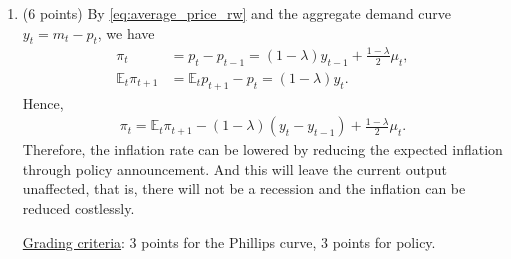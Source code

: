 \documentclass[12pt]{article}
\begin{document}
\begin{enumerate}
    Since $\lambda$ is increasing in $A$ and $A$ is decreasing in $\phi$, $\lambda$ is decreasing in $\phi$. In other words, if $\phi$ is lower, then the monetary shock has more persistent effect on output. Intuitively, as $\phi$ measures the degree of price rigidity, a lower $\phi$ indicates a more sluggish price adjustment process, and hence the effect of a monetary shock will be more persistent.

    \underline{Grading criteria}: 2 points for the IRF, 3 points for explanation.

    \item (6 points) By \eqref{eq:average_price_rw} and the aggregate demand curve $y_t = m_t - p_t$, we have
    \begin{align*}
        \pi_t &= p_t - p_{t-1} = (1-\lambda) y_{t-1} + \frac{1-\lambda}{2} \mu_t,\\
        \mathbb{E}_t \pi_{t+1} &= \mathbb{E}_t p_{t+1} - p_t = (1-\lambda) y_t.
    \end{align*}
    Hence,
    \begin{align*}
        \pi_t = \mathbb{E}_t \pi_{t+1} - (1-\lambda)(y_t - y_{t-1}) + \frac{1-\lambda}{2} \mu_t.
    \end{align*}
    Therefore, the inflation rate can be lowered by reducing the expected inflation through policy announcement. And this will leave the current output unaffected, that is, there will not be a recession and the inflation can be reduced costlessly.

    \underline{Grading criteria}: 3 points for the Phillips curve, 3 points for policy.
\end{enumerate}

\newpage
\end{document}
